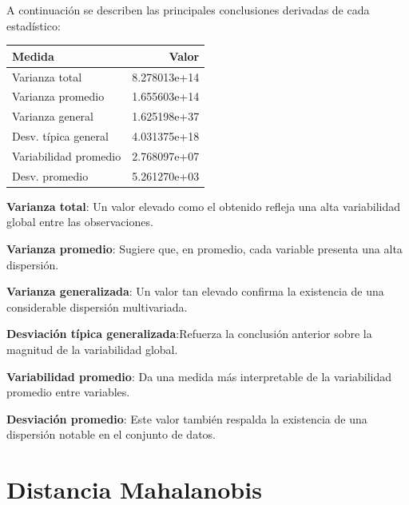 \documentclass[]{tufte-handout}
\begin{document}
\begin{justify}
A continuación se describen las principales conclusiones derivadas de cada estadístico:
\begin{marginfigure}
 
\begin{tabular}{lr}
\toprule
Medida & Valor\\
\midrule
Varianza total & 8.278013e+14\\
Varianza promedio & 1.655603e+14\\
Varianza general & 1.625198e+37\\
Desv. típica general & 4.031375e+18\\
Variabilidad promedio & 2.768097e+07\\
\addlinespace
Desv. promedio & 5.261270e+03\\
\bottomrule
\end{tabular} 
\end{marginfigure}
\textbf{Varianza total}: Un valor elevado como el obtenido refleja una alta variabilidad global entre las observaciones.

\textbf{Varianza promedio}: Sugiere que, en promedio, cada variable presenta una alta dispersión.

\textbf{Varianza generalizada}: Un valor tan elevado confirma la existencia de una considerable dispersión multivariada.

\textbf{Desviación típica generalizada}:Refuerza la conclusión anterior sobre la magnitud de la variabilidad global.

\textbf{Variabilidad promedio}: Da una medida más interpretable de la variabilidad promedio entre variables.

\textbf{Desviación promedio}: Este valor también respalda la existencia de una dispersión notable en el conjunto de datos.

\end{justify}

\section{Distancia Mahalanobis}\label{distancia-mahalanobis}
\end{document}
